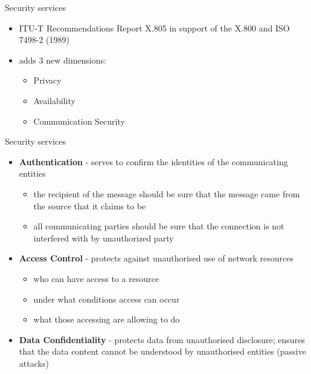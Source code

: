 \documentclass[pdf]{beamer}
\begin{document}
\begin{frame}{Security services}
\begin{itemize}
\item
ITU-T Recommendations Report X.805 in support of the X.800 and ISO 7498-2 (1989) 
\item
adds 3 new dimensions:
\begin{itemize}
\item
Privacy
\item
Availability
\item
Communication Security
\end{itemize}
\end{itemize}
\end{frame}



\begin{frame}{Security services}
\begin{itemize}
\item
\textbf{Authentication} - serves to confirm the identities of the communicating entities
\begin{itemize}
\item
the recipient of the message should be sure that the  message came from the source that it claims to be
\item
all communicating parties should be sure that the connection is not interfered with by unauthorized party
\end{itemize}
\item
\textbf{Access Control} - protects against unauthorised use of network resources
\begin{itemize}
\item
who can have access to a resource
\item
under what conditions access can occur
\item
what those accessing are allowing to do
\end{itemize}
\item
\textbf{Data Confidentiality} - protects data from unauthorised disclosure;  ensures that the data content cannot be understood by unauthorised entities (passive attacks)
\end{itemize}
\end{frame}
\end{document}
